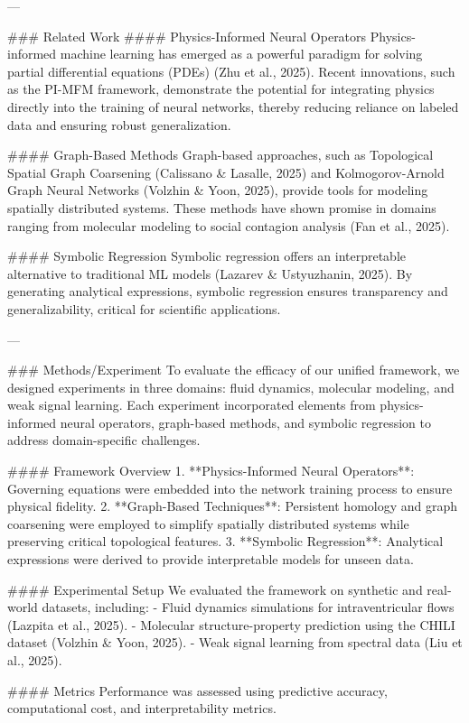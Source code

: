 ---

### Related Work  
#### Physics-Informed Neural Operators  
Physics-informed machine learning has emerged as a powerful paradigm for solving partial differential equations (PDEs) (Zhu et al., 2025). Recent innovations, such as the PI-MFM framework, demonstrate the potential for integrating physics directly into the training of neural networks, thereby reducing reliance on labeled data and ensuring robust generalization.

#### Graph-Based Methods  
Graph-based approaches, such as Topological Spatial Graph Coarsening (Calissano & Lasalle, 2025) and Kolmogorov-Arnold Graph Neural Networks (Volzhin & Yoon, 2025), provide tools for modeling spatially distributed systems. These methods have shown promise in domains ranging from molecular modeling to social contagion analysis (Fan et al., 2025).

#### Symbolic Regression  
Symbolic regression offers an interpretable alternative to traditional ML models (Lazarev & Ustyuzhanin, 2025). By generating analytical expressions, symbolic regression ensures transparency and generalizability, critical for scientific applications.

---

### Methods/Experiment  
To evaluate the efficacy of our unified framework, we designed experiments in three domains: fluid dynamics, molecular modeling, and weak signal learning. Each experiment incorporated elements from physics-informed neural operators, graph-based methods, and symbolic regression to address domain-specific challenges.

#### Framework Overview  
1. **Physics-Informed Neural Operators**: Governing equations were embedded into the network training process to ensure physical fidelity.
2. **Graph-Based Techniques**: Persistent homology and graph coarsening were employed to simplify spatially distributed systems while preserving critical topological features.
3. **Symbolic Regression**: Analytical expressions were derived to provide interpretable models for unseen data.

#### Experimental Setup  
We evaluated the framework on synthetic and real-world datasets, including:
- Fluid dynamics simulations for intraventricular flows (Lazpita et al., 2025).
- Molecular structure-property prediction using the CHILI dataset (Volzhin & Yoon, 2025).
- Weak signal learning from spectral data (Liu et al., 2025).

#### Metrics  
Performance was assessed using predictive accuracy, computational cost, and interpretability metrics.

